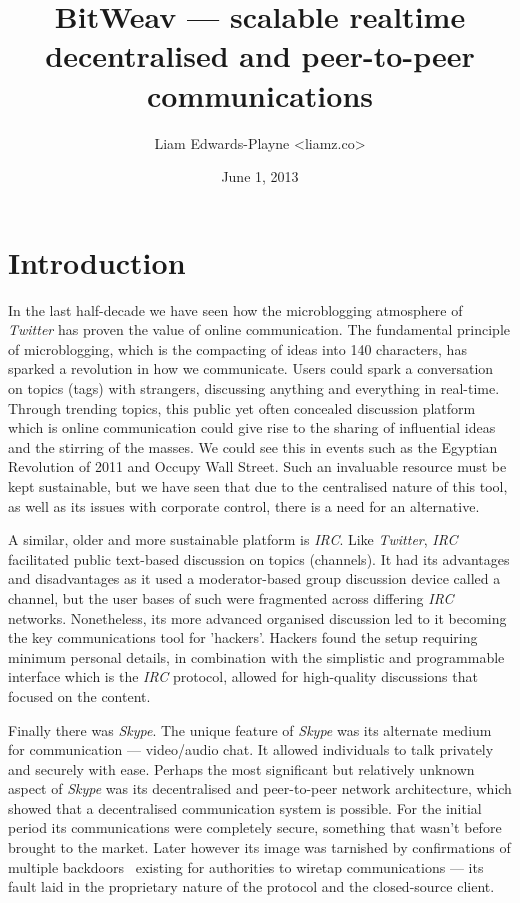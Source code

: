 \documentclass[10pt,a4paper,onecolumn]{article}
\author{Liam Edwards-Playne \textless liamz.co\textgreater}
\date{June 1, 2013}
\title{BitWeav — scalable realtime decentralised and peer-to-peer communications}
\begin{document}
\maketitle
\begin{abstract}
\end{abstract}

\section{Introduction}
\label{intro}
In the last half-decade we have seen how the microblogging atmosphere of \textit{Twitter} has proven the value of online communication. The fundamental principle of microblogging, which is the compacting of ideas into 140 characters, has sparked a revolution in how we communicate. Users could spark a conversation on topics (tags) with strangers, discussing anything and everything in real-time. Through trending topics, this public yet often concealed discussion platform which is online communication could give rise to the sharing of influential ideas and the stirring of the masses. We could see this in events such as the Egyptian Revolution of 2011 and Occupy Wall Street. Such an invaluable resource must be kept sustainable, but we have seen that due to the centralised nature of this tool, as well as its issues with corporate control, there is a need for an alternative. 

A similar, older and more sustainable platform is \textit{IRC}. Like \textit{Twitter}, \textit{IRC} facilitated public text-based discussion on topics (channels). It had its advantages and disadvantages as it used a moderator-based group discussion device called a channel, but the user bases of such were fragmented across differing \textit{IRC} networks. Nonetheless, its more advanced organised discussion led to it becoming the key communications tool for 'hackers'. Hackers found the setup requiring minimum personal details, in combination with the simplistic and programmable interface which is the \textit{IRC} protocol, allowed for high-quality discussions that focused on the content. 

Finally there was \textit{Skype}. The unique feature of \textit{Skype} was its alternate medium for communication — video/audio chat. It allowed individuals to talk privately and securely with ease. Perhaps the most significant but relatively unknown aspect of \textit{Skype} was its decentralised and peer-to-peer network architecture, which showed that a decentralised communication system is possible. For the initial period its communications were completely secure, something that wasn't before brought to the market. Later however its image was tarnished by confirmations of multiple backdoors~\cite{skypeBackdoor,skypeBackdoor2} existing for authorities to wiretap communications — its fault laid in the proprietary nature of the protocol and the closed-source client.
\end{document}
